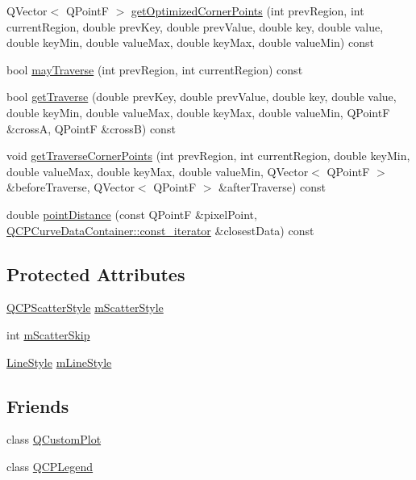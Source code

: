 \begin{DoxyCompactItemize}
\item 
Q\+Vector$<$ Q\+PointF $>$ \hyperlink{class_q_c_p_curve_a66bff7933dac149c4577ad63a27da924}{get\+Optimized\+Corner\+Points} (int prev\+Region, int current\+Region, double prev\+Key, double prev\+Value, double key, double value, double key\+Min, double value\+Max, double key\+Max, double value\+Min) const
\item 
bool \hyperlink{class_q_c_p_curve_af5df2560b30333fe662ec676bd355415}{may\+Traverse} (int prev\+Region, int current\+Region) const
\item 
bool \hyperlink{class_q_c_p_curve_afc5367ef0369d7a88ebba6eacf55f14f}{get\+Traverse} (double prev\+Key, double prev\+Value, double key, double value, double key\+Min, double value\+Max, double key\+Max, double value\+Min, Q\+PointF \&crossA, Q\+PointF \&crossB) const
\item 
void \hyperlink{class_q_c_p_curve_a55e24387fd97a2cad0def8a40809e9ec}{get\+Traverse\+Corner\+Points} (int prev\+Region, int current\+Region, double key\+Min, double value\+Max, double key\+Max, double value\+Min, Q\+Vector$<$ Q\+PointF $>$ \&before\+Traverse, Q\+Vector$<$ Q\+PointF $>$ \&after\+Traverse) const
\item 
double \hyperlink{class_q_c_p_curve_aa2c9c9c0e57f11f18a5cb7e47927157c}{point\+Distance} (const Q\+PointF \&pixel\+Point, \hyperlink{class_q_c_p_data_container_ae40a91f5cb0bcac61d727427449b7d15}{Q\+C\+P\+Curve\+Data\+Container\+::const\+\_\+iterator} \&closest\+Data) const
\end{DoxyCompactItemize}
\subsection*{Protected Attributes}
\begin{DoxyCompactItemize}
\item 
\hyperlink{class_q_c_p_scatter_style}{Q\+C\+P\+Scatter\+Style} \hyperlink{class_q_c_p_curve_a08f803b4a30b01bbd7a1eab15d0f864f}{m\+Scatter\+Style}
\item 
int \hyperlink{class_q_c_p_curve_a990bd5fdeb474459f3f6f5ad0a7b945c}{m\+Scatter\+Skip}
\item 
\hyperlink{class_q_c_p_curve_a2710e9f79302152cff794c6e16cc01f1}{Line\+Style} \hyperlink{class_q_c_p_curve_ae1f35ae2b15aee8e15bcdfec5be95156}{m\+Line\+Style}
\end{DoxyCompactItemize}
\subsection*{Friends}
\begin{DoxyCompactItemize}
\item 
class \hyperlink{class_q_c_p_curve_a1cdf9df76adcfae45261690aa0ca2198}{Q\+Custom\+Plot}
\item 
class \hyperlink{class_q_c_p_curve_a8429035e7adfbd7f05805a6530ad5e3b}{Q\+C\+P\+Legend}
\end{DoxyCompactItemize}
